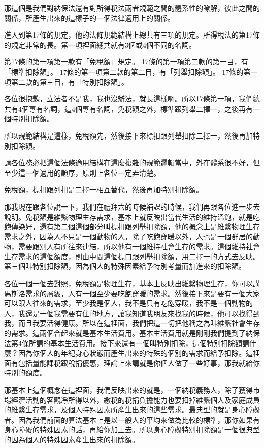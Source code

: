 \documentclass[oneside,sub3section]{ctexbook}
\begin{document}
那這個是我們對納保法還有對所得稅法兩者規範之間的體系性的瞭解，彼此之間的關係，所產生出來的這樣子的一個法律適用上的關係。

進入到第17條的規定，他的法條規範結構上總共有三項的規定。所得稅法的第17條的規定非常的長。第一項裡面總共就有3個或4個不同的名詞。

第17條的第一項第一款有「免稅額」規定。
17條的第一項第二款的第一目，有「標準扣除額」。
17條的第一項第二款的第二目，有「列舉扣除額」。
17條的第一項第二款的第三目，有「特別扣除額」。

各位很抱歉，立法者不是我，我也沒辦法，就長這樣啊。所以17條第一項，我們總共有4個專有名詞，這4個專有名詞，免稅額之外，標準跟列舉二擇一，之後再有一個特別扣除額。

所以規範結構是這樣，免稅額先，然後接下來標扣跟列舉扣除二擇一，然後再加特別扣除額。

請各位務必把這個法條適用結構在這麼複雜的規範邏輯當中，外在體系很不好，但至少這一個適用的順序，原則上各位一定弄清楚。

免稅額，標扣跟列扣是二擇一相互替代，然後再加特別扣除額。

那我現在跟各位說一下，我們在禮拜六的時候補課的時候，我們再跟各位進一步去說明。免稅額是維繫物理生存需求，基本上就反映出當代生活的維持溫飽，就是吃飽傳染好，還有第二個這個部分叫標扣跟列舉扣除額，他的概念上是維繫物理生存需求之外，因為人不只是一個動物的人，除了吃飽穿暖以外，人也是一個群居的動物，需要跟別人有所往來連結，所以他有一個維持社會生存的需求。這個維持社會生存需求的這個額度，則由中間這個標口跟列舉扣除額，用二擇一的方式去反映。第三個叫特別扣除額，因為個人的特殊因素給予特別考量而加進來的扣除額。

各位一個一個去對照，免稅額是物理生存，基本上反映出維繫物理生存，你可以講馬斯洛需求的層級，人有一個至少要吃飽穿暖的需求。然後接下來是要有一個大家可以跟人往來的需求，至少我是個人，我不是只有吃飽穿暖，我不是一個動物的人，我還是一個我需要有住的地方，讓我知道我朋友來找我的時候，他可以找得到我，而且我要活得健康。所以在這裡面，我們把這一切把他稱之為叫維繫社會生存的需求。這兩個合起來就是基本生活費用。基本生活費用就是剛剛我們提到了納保法第4條所講的基本生活費用。接下來還有一個叫特別扣除，這個特別扣除額講什麼？因為你個人的年紀身心狀態而產生出來的特殊的個別的需求而給予扣除。這裡面有包括量能課稅跟稅捐優惠，理論上來講就是你個人做了一些好事，那我就給你特別的額度。

那基本上這個概念在這裡面，我們反映出來的就是，一個納稅義務人，除了獲得市場經濟活動的客觀凈所得以外，繳稅的稅捐負擔能力也要扣掉維繫個人及家庭成員的維繫生存需求，及個人特殊因素所產生出來的這些需求。最典型的就是身心障礙者。因為我們前面的算法基本上是以一般人的平均來做為比較的標準，那你如果有身心障礙的特殊因素的話，再給你加上去。所以身心障礙特別扣除額是一個很典型的因為個人的特殊因素產生出來的扣除額。
\end{document}
